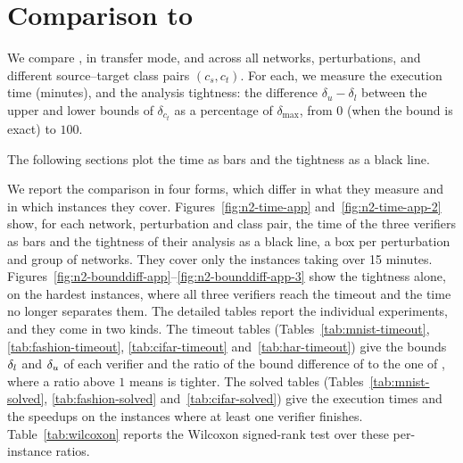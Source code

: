 \FloatBarrier

\section{Comparison to \baseline}
\label{sec:evaluation-comparison}


We compare \tool, \tool in transfer mode, and \baseline across all networks, perturbations,
and different source--target class pairs $(c_s, c_t)$. For each, we measure the execution time (minutes),
and the analysis tightness: the difference $\delta_u-\delta_l$ between the upper and lower bounds
of $\delta_{c_t}$ as a percentage of $\delta_{\max}$, from $0$ (when the bound is exact) to $100$.

The following sections plot the time as bars and the tightness as a black line.

We report the comparison in four forms, which differ in what they
measure and in which instances they cover. Figures~\ref{fig:n2-time-app} and~\ref{fig:n2-time-app-2}
show, for each network, perturbation and class pair, the time of the
three verifiers as bars and the tightness of their analysis as a black
line, a box per perturbation and group of networks. They cover only the instances
taking over 15 minutes. Figures~\ref{fig:n2-bounddiff-app}--\ref{fig:n2-bounddiff-app-3}
show the tightness alone, on the hardest instances, where all three
verifiers reach the timeout and the time no longer
separates them. The detailed tables report the individual experiments,
and they come in two kinds. The timeout tables (Tables~\ref{tab:mnist-timeout}, \ref{tab:fashion-timeout}, \ref{tab:cifar-timeout} and~\ref{tab:har-timeout}) give the bounds
$\delta_l$ and $\delta_u$ of each verifier and the ratio of the bound
difference of \baseline to the one of \tool, where a ratio above $1$
means \tool is tighter. The solved tables (Tables~\ref{tab:mnist-solved}, \ref{tab:fashion-solved} and~\ref{tab:cifar-solved}) give the
execution times and the speedups on the instances where at least one
verifier finishes. Table~\ref{tab:wilcoxon} reports the Wilcoxon signed-rank
test over these per-instance ratios.

